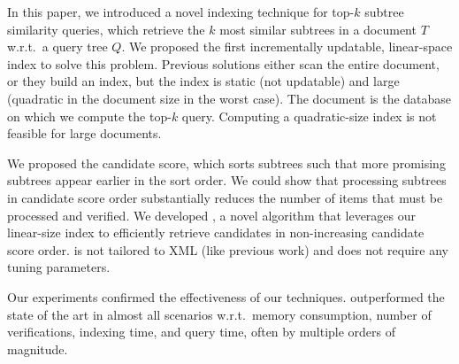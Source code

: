 
In this paper, we introduced a novel indexing technique for top-$k$ subtree
similarity queries, which retrieve the $k$ most similar subtrees in a document
$T$ w.r.t.\ a query tree $Q$. We proposed the first incrementally updatable, linear-space index to solve this problem. Previous solutions either scan the entire document, or they build an index, but the index is static (not updatable) and large (quadratic in the document size in the worst case). The document is the database on which we compute the top-$k$ query. Computing a quadratic-size index is not feasible for large documents.

We proposed the candidate score, which sorts subtrees such that more promising subtrees appear earlier in the sort order. We could show that processing subtrees in candidate score order substantially reduces the number of items that must be processed and verified. We developed \shincone{}, a novel algorithm that leverages our linear-size index to efficiently retrieve candidates in non-increasing candidate score order. \shincone{} is not tailored to XML (like previous work) and does not require any tuning parameters.

Our experiments confirmed the effectiveness of our techniques. \shincone{} outperformed the state of the art in almost all scenarios w.r.t.\ memory consumption, number of verifications, indexing time, and query time, often by multiple orders of magnitude.
